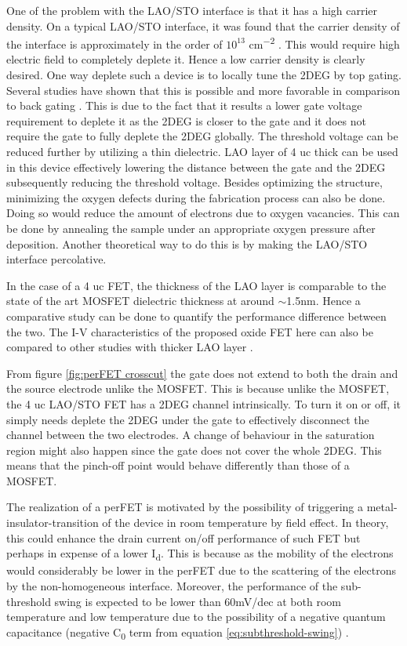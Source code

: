 \documentclass[11pt,a4paper]{report}
\begin{document}
One of the problem with the LAO/STO interface is that it has a high carrier density. On a typical LAO/STO interface, it was found that the carrier density of the interface is approximately in the order of $10^{13}$ \si{cm^{-2}} \cite{thiel_2006}. This would require high electric field to completely deplete it. Hence a low carrier density is clearly desired. One way deplete such a device is to locally tune the 2DEG by top gating. Several studies have shown that this is possible and more favorable in comparison to back gating \cite{forg_richter_mannhart_2012,caviglia}. This is due to the fact that it results a lower gate voltage requirement to deplete it as the 2DEG is closer to the gate and it does not require the gate to fully deplete the 2DEG globally. The threshold voltage can be reduced further by utilizing a thin dielectric. LAO layer of 4 uc thick can be used in this device effectively lowering the distance between the gate and the 2DEG subsequently reducing the threshold voltage. Besides optimizing the structure, minimizing the oxygen defects during the fabrication process can also be done. Doing so would reduce the amount of electrons due to oxygen vacancies. This can be done by annealing the sample under an appropriate oxygen pressure after deposition. Another theoretical way to do this is by making the LAO/STO interface percolative. 

In the case of a 4 uc FET, the thickness of the LAO layer is comparable to the state of the art MOSFET dielectric thickness at around $\sim$1.5\si{nm}. Hence a comparative study can be done to quantify the performance difference between the two. The I-V characteristics of the proposed oxide FET here can also be compared to other studies with thicker LAO layer \cite{eerkes_wiel_hilgenkamp_2013, hosoda_hikita_hwang_bell_2013, forg_richter_mannhart_2012}. 

From figure \ref{fig:perFET crosscut} the gate does not extend to both the drain and the source electrode unlike the MOSFET. This is because unlike the MOSFET, the 4 uc LAO/STO FET has a 2DEG channel intrinsically. To turn it on or off, it simply needs deplete the 2DEG under the gate to effectively disconnect the channel between the two electrodes. A change of behaviour in the saturation region might also happen since the gate does not cover the whole 2DEG. This means that the pinch-off point would behave differently than those of a MOSFET.

The realization of a perFET is motivated by the possibility of triggering a metal-insulator-transition of the device in room temperature by field effect. In theory, this could enhance the drain current on/off performance of such FET but perhaps in expense of a lower I\textsubscript{d}. This is because as the mobility of the electrons would considerably be lower in the perFET due to the scattering of the electrons by the non-homogeneous interface. Moreover, the performance of the sub-threshold swing is expected to be lower than 60mV/dec at both room temperature and low temperature due to the possibility of a negative quantum capacitance (negative C\textsubscript{0} term from equation \ref{eq:subthreshold-swing}) \cite{li_Large_capacitance_enhancement_2011}.
\end{document}
